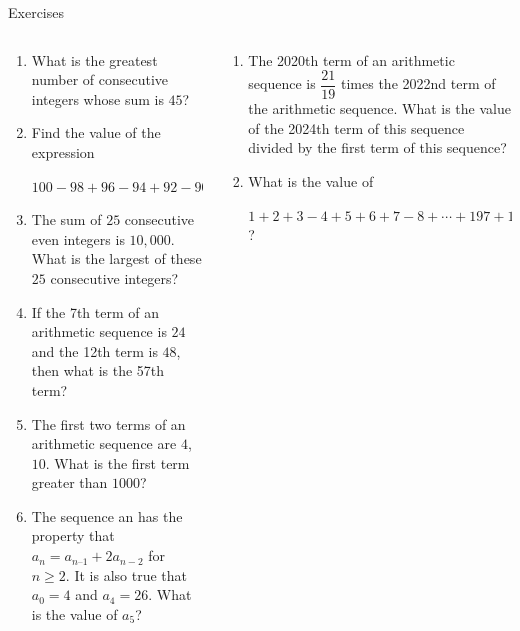 \documentclass[9pt,aspectratio=169]{beamer}
\begin{document}
\begin{frame}{Exercises}
  \begin{columns}[T]
    \begin{column}{0.5\textwidth}
      \begin{enumerate}
        \item What is the greatest number of consecutive integers whose sum is $45$? %
        \item Find the value of the expression
        
        $100-98+96-94+92-90+\cdots+8-6+4-2.$ %
        \item The sum of $25$ consecutive even integers is $10,000$. What is the largest of these $25$ consecutive integers? %
        \item If the 7th term of an arithmetic sequence is $24$ and the 12th term is $48$, then what is
        the 57th term? %
        \item The first two terms of an arithmetic sequence are $4$, $10$. What is the first term greater
        than $1000$? %
        \item The sequence an has the property that $a_{n} = a_{n – 1} + 2a_{n-2}$ for $n \geq 2$. It is also
        true that $a_0 = 4$ and $a_4 = 26$. What is the value of $a_{5}$? %
        \seti
      \end{enumerate}
    \end{column}
    \begin{column}{0.5\textwidth}
      \begin{enumerate}
        \conti
        \item The 2020th term of an arithmetic sequence is $\dfrac{21}
        {19}$ times the 2022nd term of the arithmetic sequence.
        What is the value of the 2024th term of this sequence divided by the first term of this sequence? %
        \item What is the value of

        $1+2+3-4+5+6+7-8+\cdots+197+198+199-200$? %
      \end{enumerate}
    \end{column}
  \end{columns}
\end{frame}
\end{document}
